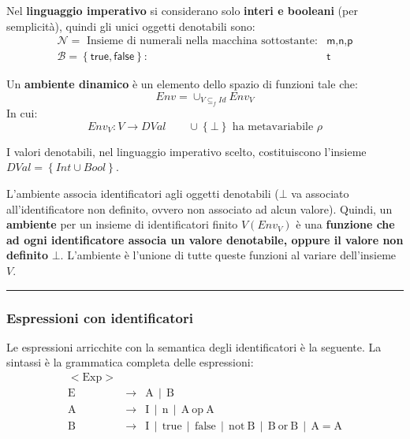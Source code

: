 \documentclass[a4paper]{article}
\newcommand{\longline}{\noindent\rule{\textwidth}{0.4pt}}
\begin{document}
	Nel \textbf{linguaggio imperativo} si considerano solo \textbf{interi e booleani} (per semplicità), quindi gli unici oggetti denotabili sono:
	\begin{equation*}
		\begin{array}{rl}
			\mathcal{N} = \text{ Insieme di numerali nella macchina sottostante:} & \textsf{m,n,p} \\
			\mathcal{B} = \left\{\textsf{true}, \textsf{false}\right\}: & \textsf{t}
		\end{array}
	\end{equation*}
	\begin{boxdef}
		Un \textcolor{Red3}{\textbf{ambiente dinamico}} è un elemento dello spazio di funzioni tale che:
		\begin{equation*}
			Env = \cup_{V \subseteq_{f} Id} Env_{V}
		\end{equation*}
		In cui:
		\begin{equation*}
			Env_{V}: V \rightarrow DVal \hspace{2em} \cup\left\{\bot\right\} \text{ ha metavariabile }\rho
		\end{equation*}
	\end{boxdef}
	
	\noindent
	I valori denotabili, nel linguaggio imperativo scelto, costituiscono l'insieme $DVal = \left\{Int \cup Bool\right\}$.\newline\label{DVal}
	
	\noindent
	L'ambiente associa identificatori agli oggetti denotabili ($\bot$ va associato all'identificatore non definito, ovvero non associato ad alcun valore). Quindi, un \textbf{ambiente} per un insieme di identificatori finito $V\left(Env_{V}\right)$ è una \textbf{funzione che ad ogni identificatore associa un valore denotabile, oppure il valore non definito }$\bot$. L'ambiente è l'unione di tutte queste funzioni al variare dell'insieme $V$.
	
	\longline
	
	\subsubsection{Espressioni con identificatori}
	
	Le espressioni arricchite con la semantica degli identificatori è la seguente. La sintassi è la grammatica completa delle espressioni:
	\begin{equation*}
		\begin{array}{rll}
			\mathrm{<Exp>} & & \\
			\mathrm{E} & \rightarrow & \mathrm{A} \:\: | \:\: \mathrm{B} \\
			\mathrm{A} & \rightarrow & \mathrm{I} \:\: | \:\: \mathrm{n} \:\: | \:\: \mathrm{A} \: \mathrm{op} \: \mathrm{A} \\
			\mathrm{B} & \rightarrow & \mathrm{I} \:\: | \:\: \mathrm{true} \:\: | \:\: \mathrm{false} \:\: | \:\: \mathrm{not} \: \mathrm{B} \:\: | \:\: \mathrm{B} \: \mathrm{or} \: \mathrm{B} \:\: | \:\: \mathrm{A} = \mathrm{A}
		\end{array}
	\end{equation*}
	
\end{document}

